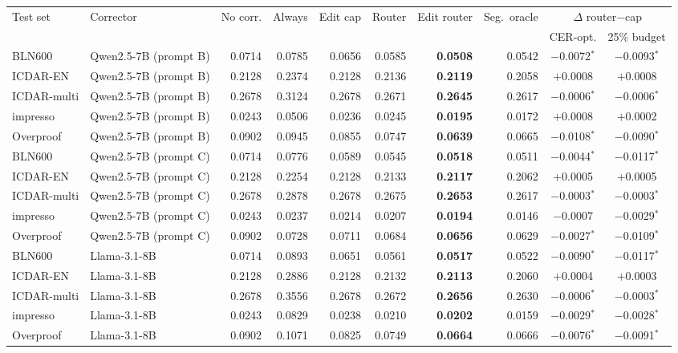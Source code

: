 \begin{tabular}{llrrrrrrcc}
\toprule
Test set & Corrector & No corr. & Always & Edit cap & Router & Edit router & Seg.\ oracle & \multicolumn{2}{c}{$\Delta$ router$-$cap} \\
 & & & & & & & & CER-opt. & 25\% budget \\
\midrule
BLN600 & Qwen2.5-7B (prompt B) & 0.0714 & 0.0785 & 0.0656 & 0.0585 & \textbf{0.0508} & 0.0542 & $-$0.0072$^{*}$ & $-$0.0093$^{*}$ \\
ICDAR-EN & Qwen2.5-7B (prompt B) & 0.2128 & 0.2374 & 0.2128 & 0.2136 & \textbf{0.2119} & 0.2058 & $+$0.0008 & $+$0.0008 \\
ICDAR-multi & Qwen2.5-7B (prompt B) & 0.2678 & 0.3124 & 0.2678 & 0.2671 & \textbf{0.2645} & 0.2617 & $-$0.0006$^{*}$ & $-$0.0006$^{*}$ \\
impresso & Qwen2.5-7B (prompt B) & 0.0243 & 0.0506 & 0.0236 & 0.0245 & \textbf{0.0195} & 0.0172 & $+$0.0008 & $+$0.0002 \\
Overproof & Qwen2.5-7B (prompt B) & 0.0902 & 0.0945 & 0.0855 & 0.0747 & \textbf{0.0639} & 0.0665 & $-$0.0108$^{*}$ & $-$0.0090$^{*}$ \\
BLN600 & Qwen2.5-7B (prompt C) & 0.0714 & 0.0776 & 0.0589 & 0.0545 & \textbf{0.0518} & 0.0511 & $-$0.0044$^{*}$ & $-$0.0117$^{*}$ \\
ICDAR-EN & Qwen2.5-7B (prompt C) & 0.2128 & 0.2254 & 0.2128 & 0.2133 & \textbf{0.2117} & 0.2062 & $+$0.0005 & $+$0.0005 \\
ICDAR-multi & Qwen2.5-7B (prompt C) & 0.2678 & 0.2878 & 0.2678 & 0.2675 & \textbf{0.2653} & 0.2617 & $-$0.0003$^{*}$ & $-$0.0003$^{*}$ \\
impresso & Qwen2.5-7B (prompt C) & 0.0243 & 0.0237 & 0.0214 & 0.0207 & \textbf{0.0194} & 0.0146 & $-$0.0007 & $-$0.0029$^{*}$ \\
Overproof & Qwen2.5-7B (prompt C) & 0.0902 & 0.0728 & 0.0711 & 0.0684 & \textbf{0.0656} & 0.0629 & $-$0.0027$^{*}$ & $-$0.0109$^{*}$ \\
BLN600 & Llama-3.1-8B & 0.0714 & 0.0893 & 0.0651 & 0.0561 & \textbf{0.0517} & 0.0522 & $-$0.0090$^{*}$ & $-$0.0117$^{*}$ \\
ICDAR-EN & Llama-3.1-8B & 0.2128 & 0.2886 & 0.2128 & 0.2132 & \textbf{0.2113} & 0.2060 & $+$0.0004 & $+$0.0003 \\
ICDAR-multi & Llama-3.1-8B & 0.2678 & 0.3556 & 0.2678 & 0.2672 & \textbf{0.2656} & 0.2630 & $-$0.0006$^{*}$ & $-$0.0003$^{*}$ \\
impresso & Llama-3.1-8B & 0.0243 & 0.0829 & 0.0238 & 0.0210 & \textbf{0.0202} & 0.0159 & $-$0.0029$^{*}$ & $-$0.0028$^{*}$ \\
Overproof & Llama-3.1-8B & 0.0902 & 0.1071 & 0.0825 & 0.0749 & \textbf{0.0664} & 0.0666 & $-$0.0076$^{*}$ & $-$0.0091$^{*}$ \\
\bottomrule
\end{tabular}

